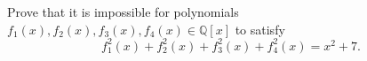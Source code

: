 Prove that it is impossible for polynomials $f_1(x),f_2(x),f_3(x),f_4(x)\in \mathbb{Q}[x]$ to satisfy \[f_1^2(x)+f_2^2(x)+f_3^2(x)+f_4^2(x) = x^2+7.\]
